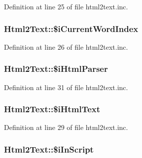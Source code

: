 Definition at line 25 of file html2text.\+inc.

\hypertarget{classHtml2Text_afd51143c5a22243e3fdb296b165b75fc}{
\subsubsection[{\$i\+Current\+Word\+Index}]{\setlength{\rightskip}{0pt plus 5cm}Html2\+Text\+::\$i\+Current\+Word\+Index}}\label{classHtml2Text_afd51143c5a22243e3fdb296b165b75fc}


Definition at line 26 of file html2text.\+inc.

\hypertarget{classHtml2Text_a22abd87860bf97f5eedbe8849d67a2d8}{
\subsubsection[{\$i\+Html\+Parser}]{\setlength{\rightskip}{0pt plus 5cm}Html2\+Text\+::\$i\+Html\+Parser}}\label{classHtml2Text_a22abd87860bf97f5eedbe8849d67a2d8}


Definition at line 31 of file html2text.\+inc.

\hypertarget{classHtml2Text_aec57c716088597cbf5ef823a4ad9237d}{
\subsubsection[{\$i\+Html\+Text}]{\setlength{\rightskip}{0pt plus 5cm}Html2\+Text\+::\$i\+Html\+Text}}\label{classHtml2Text_aec57c716088597cbf5ef823a4ad9237d}


Definition at line 29 of file html2text.\+inc.

\hypertarget{classHtml2Text_ad1ac7e0033e7147f70634201d4c75c3a}{
\subsubsection[{\$i\+In\+Script}]{\setlength{\rightskip}{0pt plus 5cm}Html2\+Text\+::\$i\+In\+Script}}\label{classHtml2Text_ad1ac7e0033e7147f70634201d4c75c3a}


